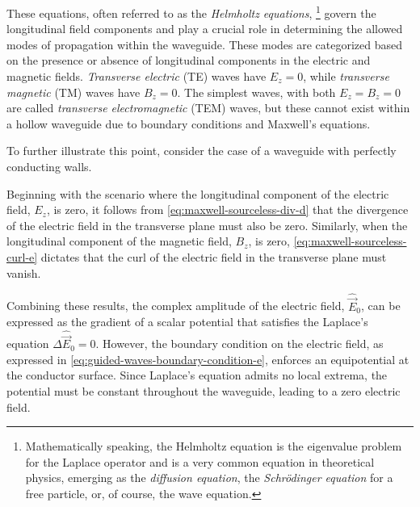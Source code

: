 \documentclass[11pt,a4paper,twoside,openany]{report}
\begin{document}
These equations, often referred to as the \emph{Helmholtz equations},%
    \footnote{Mathematically speaking, the Helmholtz equation is the eigenvalue problem for the Laplace operator and is a very common equation in theoretical physics, emerging as the \emph{diffusion equation}, the \emph{Schr\"odinger equation} for a free particle, or, of course, the wave equation.}
govern the longitudinal field components and play a crucial role in determining the allowed modes of propagation within the waveguide. These modes are categorized based on the presence or absence of longitudinal components in the electric and magnetic fields. \emph{Transverse electric} (TE) waves have $E_z=0$, while \emph{transverse magnetic} (TM) waves have $B_z=0$. The simplest waves, with both $E_z=B_z=0$ are called \emph{transverse electromagnetic} (TEM) waves, but these cannot exist within a hollow waveguide due to boundary conditions and Maxwell's equations.

\begin{remark}
    \label{remark:nonexistence-of-tem-waves-in-hollow-waveguides}
    To further illustrate this point, consider the case of a waveguide with perfectly conducting walls.
    
    Beginning with the scenario where the longitudinal component of the electric field, $E_z$, is zero, it follows from \cref{eq:maxwell-sourceless-div-d} that the divergence of the electric field in the transverse plane must also be zero. Similarly, when the longitudinal component of the magnetic field, $B_z$, is zero, \cref{eq:maxwell-sourceless-curl-e} dictates that the curl of the electric field in the transverse plane must vanish.
    
    Combining these results, the complex amplitude of the electric field, $\hat{\vec E}_0$, can be expressed as the gradient of a scalar potential that satisfies the Laplace's equation $\Delta\hat{\vec E}_0 = 0$. However, the boundary condition on the electric field, as expressed in \cref{eq:guided-waves-boundary-condition-e}, enforces an equipotential at the conductor surface. Since Laplace's equation admits no local extrema, the potential must be constant throughout the waveguide, leading to a zero electric field.
\end{remark}
\end{document}
